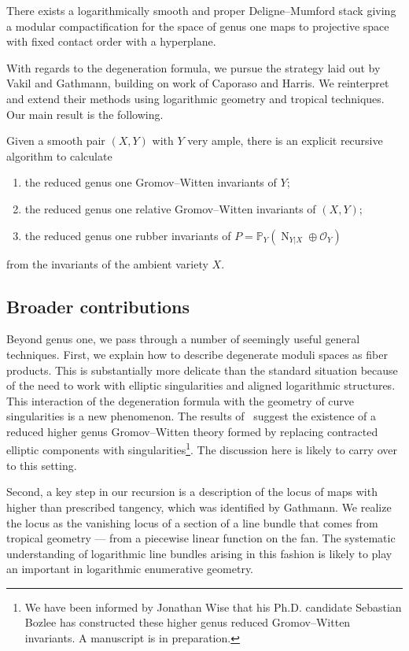 \documentclass[11pt]{amsart}
\newcommand{\PP}{\mathbb P}
\newcommand{\OO}{\mathcal{O}}
\theoremstyle{definition}
\newenvironment{customthm}[1]
  {\renewcommand\theinnercustomthm{#1}\innercustomthm}
  {\endinnercustomthm}
\theoremstyle{definition}
\begin{document}
\begin{customthm}{A}
There exists a logarithmically smooth and proper Deligne--Mumford stack giving a modular compactification for the space of genus one maps to projective space with fixed contact order with a hyperplane. 
\end{customthm}

With regards to the degeneration formula, we pursue the strategy laid out by Vakil and Gathmann, building on work of Caporaso and Harris. We reinterpret and extend their methods using logarithmic geometry and tropical techniques. Our main result is the following.

\begin{customthm}{B}
Given a smooth pair $(X,Y)$ with $Y$ very ample, there is an explicit recursive algorithm to calculate
\begin{enumerate}
\item the reduced genus one Gromov--Witten invariants of $Y$;
\item the reduced genus one relative Gromov--Witten invariants of $(X,Y)$; 
\item the reduced genus one rubber invariants of $P=\PP_Y(\operatorname{N}_{Y|X} \oplus \OO_Y)$
\end{enumerate}
from the invariants of the ambient variety $X$.
\end{customthm}

\subsection{Broader contributions} Beyond genus one, we pass through a number of seemingly useful general techniques. First, we explain how to describe degenerate moduli spaces as fiber products. This is substantially more delicate than the standard situation because of the need to work with elliptic singularities and aligned logarithmic structures. This interaction of the degeneration formula with the geometry of curve singularities is a new phenomenon. The results of~\cite{RSPW} suggest the existence of a reduced higher genus Gromov--Witten theory formed by replacing contracted elliptic components with singularities\footnote{We have been informed by Jonathan Wise that his Ph.D. candidate Sebastian Bozlee has constructed these higher genus reduced Gromov--Witten invariants. A manuscript is in preparation.}. The discussion here is likely to carry over to this setting.

Second, a key step in our recursion is a description of the locus of maps with higher than prescribed tangency, which was identified by Gathmann. We realize the locus as the vanishing locus of a section of a line bundle that comes from tropical geometry — from a piecewise linear function on the fan. The systematic understanding of logarithmic line bundles arising in this fashion is likely to play an important in logarithmic enumerative geometry.
\end{document}
